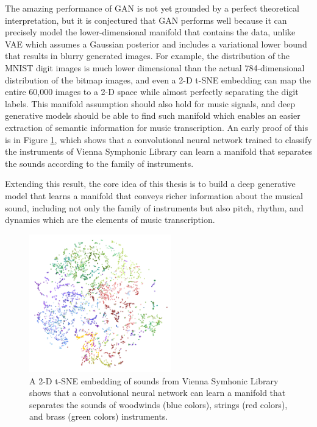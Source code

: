 The amazing performance of GAN is not yet grounded by a perfect theoretical interpretation, but it is conjectured that GAN performs well because it can precisely model the lower-dimensional manifold that contains the data, unlike VAE which assumes a Gaussian posterior and includes a variational lower bound that results in blurry generated images.
For example, the distribution of the MNIST digit images \cite{lecun1998mnist} is much lower dimensional than the actual 784-dimensional distribution of the bitmap images, and even a 2-D t-SNE embedding \cite{maaten2008tsne} can map the entire 60,000 images to a 2-D space while almost perfectly separating the digit labels.
This manifold assumption should also hold for music signals, and deep generative models should be able to find such manifold which enables an easier extraction of semantic information for music transcription.
An early proof of this is in Figure \ref{fig:tsne}, which shows that a convolutional neural network trained to classify the instruments of Vienna Symphonic Library can learn a manifold that separates the sounds according to the family of instruments.

Extending this result, the core idea of this thesis is to build a deep generative model that learns a manifold that conveys richer information about the musical sound, including not only the family of instruments but also pitch, rhythm, and dynamics which are the elements of music transcription.

\begin{figure}
	\centering
	\includegraphics[width=0.55\textwidth]{instruments-tsne.png}
	\caption{A 2-D t-SNE embedding of sounds from Vienna Symhonic Library shows that a convolutional neural network can learn a manifold that separates the sounds of woodwinds (blue colors), strings (red colors), and brass (green colors) instruments.}\label{fig:tsne}
\end{figure}






